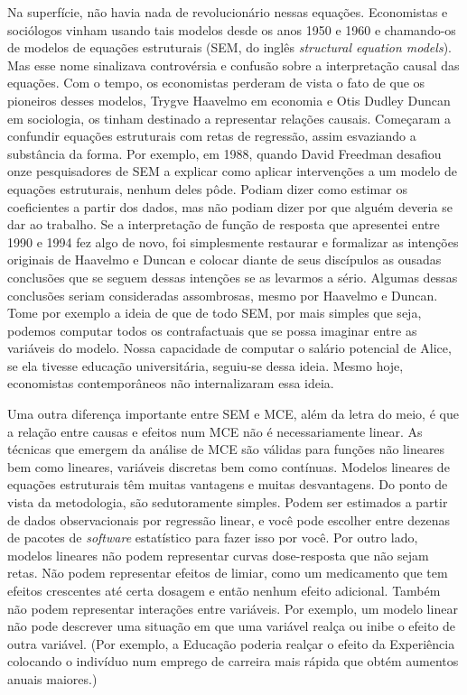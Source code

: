 \documentclass[11pt,a5paper,twoside]{book}
\begin{document}
Na superfície, não havia nada de revolucionário nessas equações. Economistas e sociólogos vinham usando tais modelos desde os anos 1950 e 1960 e chamando-os de modelos de equações estruturais (SEM, do inglês \textit{structural equation models}). Mas esse nome sinalizava controvérsia e confusão sobre a interpretação causal das equações. Com o tempo, os economistas perderam de vista o fato de que os pioneiros desses modelos, Trygve Haavelmo em economia e Otis Dudley Duncan em sociologia, os tinham destinado a representar relações causais. Começaram a confundir equações estruturais com retas de regressão, assim esvaziando a substância da forma. Por exemplo, em 1988, quando David Freedman desafiou onze pesquisadores de SEM a explicar como aplicar intervenções a um modelo de equações estruturais, nenhum deles pôde. Podiam dizer como estimar os coeficientes a partir dos dados, mas não podiam dizer por que alguém deveria se dar ao trabalho. Se a interpretação de função de resposta que apresentei entre 1990 e 1994 fez algo de novo, foi simplesmente restaurar e formalizar as intenções originais de Haavelmo e Duncan e colocar diante de seus discípulos as ousadas conclusões que se seguem dessas intenções se as levarmos a sério. Algumas dessas conclusões seriam consideradas assombrosas, mesmo por Haavelmo e Duncan. Tome por exemplo a ideia de que de todo SEM, por mais simples que seja, podemos computar todos os contrafactuais que se possa imaginar entre as variáveis do modelo. Nossa capacidade de computar o salário potencial de Alice, se ela tivesse educação universitária, seguiu-se dessa ideia. Mesmo hoje, economistas contemporâneos não internalizaram essa ideia.

Uma outra diferença importante entre SEM e MCE, além da letra do meio, é que a relação entre causas e efeitos num MCE não é necessariamente linear. As técnicas que emergem da análise de MCE são válidas para funções não lineares bem como lineares, variáveis discretas bem como contínuas. Modelos lineares de equações estruturais têm muitas vantagens e muitas desvantagens. Do ponto de vista da metodologia, são sedutoramente simples. Podem ser estimados a partir de dados observacionais por regressão linear, e você pode escolher entre dezenas de pacotes de \textit{software} estatístico para fazer isso por você. Por outro lado, modelos lineares não podem representar curvas dose-resposta que não sejam retas. Não podem representar efeitos de limiar, como um medicamento que tem efeitos crescentes até certa dosagem e então nenhum efeito adicional. Também não podem representar interações entre variáveis. Por exemplo, um modelo linear não pode descrever uma situação em que uma variável realça ou inibe o efeito de outra variável. (Por exemplo, a Educação poderia realçar o efeito da Experiência colocando o indivíduo num emprego de carreira mais rápida que obtém aumentos anuais maiores.)
\end{document}
